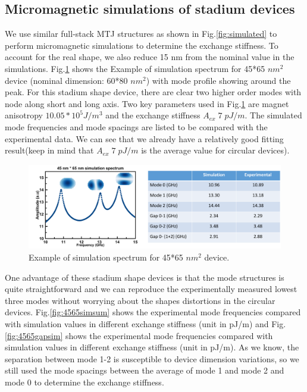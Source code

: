 \subsection{Micromagnetic simulations of stadium devices}

We use similar full-stack MTJ structures as shown in Fig.\ref{fig:simulated} to perform micromagnetic simulations to determine the exchange stiffness. To account for the real shape, we also reduce 15 nm from the nominal value in the simulations. Fig.\ref{fig:4565sim} shows the Example of simulation spectrum for 45*65 $nm^2$ device (nominal dimension: 60*80 $nm^2$) with mode profile showing around the peak. For this stadium shape device, there are clear two higher order modes with node along short and long axis. Two key parameters used in Fig.\ref{fig:4565sim} are magnet anisotropy $10.05*10^5 J/m^3$ and the exchange stiffness $ A_{ex} \; 7 \; pJ/m $. The simulated mode frequencies and mode spacings are listed to be compared with the experimental data. We can see that we already have a relatively good fitting result(keep in mind that $ A_{ex} \; 7 \; pJ/m $ is the average value for circular devices).

\begin{figure}[!ht]
  \centering
  \includegraphics[width=1.0\textwidth]{fig/stadium/4565sim}
   \caption{Example of simulation spectrum for 45*65 $nm^2$ device.}
  \label{fig:4565sim}
\end{figure}

One advantage of these stadium shape devices is that the mode structures is quite straightforward and we can reproduce the experimentally measured lowest three modes without worrying about the shapes distortions in the circular devices. Fig.\ref{fig:4565simsum} shows the experimental mode frequencies compared with simulation values in different exchange stiffness (unit in pJ/m) and Fig.\ref{fig:4565gapsim} shows the experimental mode frequencies compared with simulation values in different exchange stiffness (unit in pJ/m). As we know, the separation between mode 1-2 is susceptible to device dimension variations, so we still used the mode spacings between the average of mode 1 and mode 2 and mode 0 to determine the exchange stiffness.

